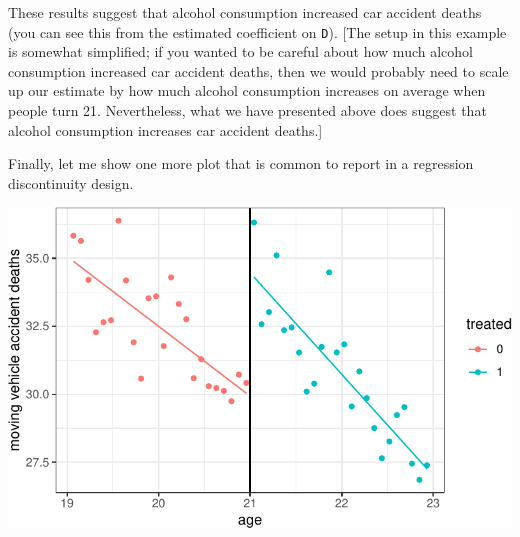 \documentclass[
  letterpaper,
  DIV=11,
  numbers=noendperiod]{scrreprt}
\newenvironment{Shaded}{\begin{snugshade}}{\end{snugshade}}
\newcommand{\AttributeTok}[1]{\textcolor[rgb]{0.40,0.45,0.13}{#1}}
\newcommand{\CommentTok}[1]{\textcolor[rgb]{0.37,0.37,0.37}{#1}}
\newcommand{\DecValTok}[1]{\textcolor[rgb]{0.68,0.00,0.00}{#1}}
\newcommand{\FunctionTok}[1]{\textcolor[rgb]{0.28,0.35,0.67}{#1}}
\newcommand{\NormalTok}[1]{\textcolor[rgb]{0.00,0.23,0.31}{#1}}
\newcommand{\OtherTok}[1]{\textcolor[rgb]{0.00,0.23,0.31}{#1}}
\newcommand{\SpecialCharTok}[1]{\textcolor[rgb]{0.37,0.37,0.37}{#1}}
\newcommand{\StringTok}[1]{\textcolor[rgb]{0.13,0.47,0.30}{#1}}
\begin{document}
These results suggest that alcohol consumption increased car accident
deaths (you can see this from the estimated coefficient on \texttt{D}).
{[}The setup in this example is somewhat simplified; if you wanted to be
careful about how much alcohol consumption increased car accident
deaths, then we would probably need to scale up our estimate by how much
alcohol consumption increases on average when people turn 21.
Nevertheless, what we have presented above does suggest that alcohol
consumption increases car accident deaths.{]}

Finally, let me show one more plot that is common to report in a
regression discontinuity design.

\begin{Shaded}
\end{Shaded}

\includegraphics{07-causal_inference_files/figure-pdf/unnamed-chunk-11-1.pdf}
\end{document}
